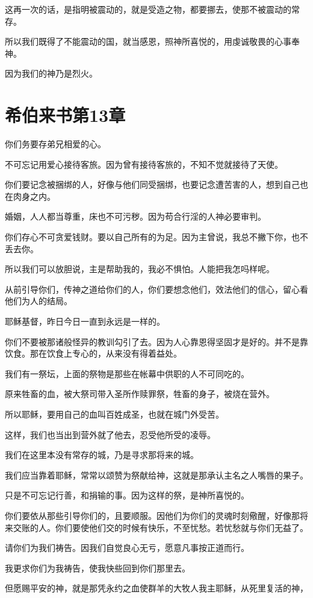 \documentclass[12pt,oneside]{book}
\begin{document}
这再一次的话，是指明被震动的，就是受造之物，都要挪去，使那不被震动的常存。

所以我们既得了不能震动的国，就当感恩，照神所喜悦的，用虔诚敬畏的心事奉神。

因为我们的神乃是烈火。

\chapter{希伯来书第13章}
你们务要存弟兄相爱的心。

不可忘记用爱心接待客旅。因为曾有接待客旅的，不知不觉就接待了天使。

你们要记念被捆绑的人，好像与他们同受捆绑，也要记念遭苦害的人，想到自己也在肉身之内。

婚姻，人人都当尊重，床也不可污秽。因为苟合行淫的人神必要审判。

你们存心不可贪爱钱财。要以自己所有的为足。因为主曾说，我总不撇下你，也不丢去你。

所以我们可以放胆说，主是帮助我的，我必不惧怕。人能把我怎吗样呢。

从前引导你们，传神之道给你们的人，你们要想念他们，效法他们的信心，留心看他们为人的结局。

耶稣基督，昨日今日一直到永远是一样的。

你们不要被那诸般怪异的教训勾引了去。因为人心靠恩得坚固才是好的。并不是靠饮食。那在饮食上专心的，从来没有得着益处。

我们有一祭坛，上面的祭物是那些在帐幕中供职的人不可同吃的。

原来牲畜的血，被大祭司带入圣所作赎罪祭，牲畜的身子，被烧在营外。

所以耶稣，要用自己的血叫百姓成圣，也就在城门外受苦。

这样，我们也当出到营外就了他去，忍受他所受的凌辱。

我们在这里本没有常存的城，乃是寻求那将来的城。

我们应当靠着耶稣，常常以颂赞为祭献给神，这就是那承认主名之人嘴唇的果子。

只是不可忘记行善，和捐输的事。因为这样的祭，是神所喜悦的。

你们要依从那些引导你们的，且要顺服。因他们为你们的灵魂时刻儆醒，好像那将来交账的人。你们要使他们交的时候有快乐，不至忧愁。若忧愁就与你们无益了。

请你们为我们祷告。因我们自觉良心无亏，愿意凡事按正道而行。

我更求你们为我祷告，使我快些回到你们那里去。

但愿赐平安的神，就是那凭永约之血使群羊的大牧人我主耶稣，从死里复活的神，
\end{document}
